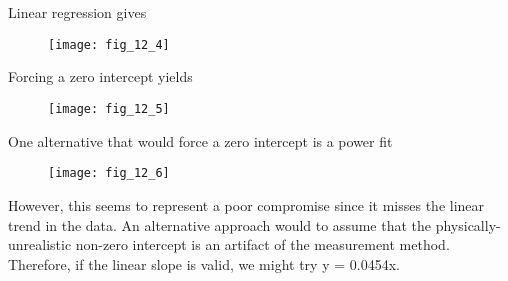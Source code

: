\documentclass[../main.tex]{subfiles}
\begin{document}
\section{}
Linear regression gives
\bigbreak
	\begin{figure}[H]
		\texttt{[image: fig\_12\_4]}
		\label{fig:fig_12_4}
	\end{figure}
	\bigbreak
Forcing a zero intercept yields
	\begin{figure}[H]
		\texttt{[image: fig\_12\_5]}
		\label{fig:fig_12_5}
	\end{figure}
	\bigbreak
One alternative that would force a zero intercept is a power fit 
	\begin{figure}[H]
		\texttt{[image: fig\_12\_6]}
		\label{fig:fig_12_6}
	\end{figure}
	\bigbreak
\begin{blockquote}
However, this seems to represent a poor compromise since it misses the linear trend in the
data. An alternative approach would to assume that the physically-unrealistic non-zero
intercept is an artifact of the measurement method. Therefore, if the linear slope is valid,
we might try y = 0.0454x.
\end{blockquote} 
\end{document}
